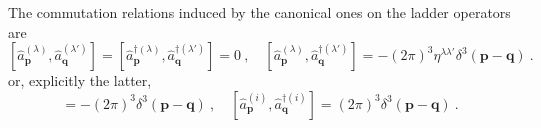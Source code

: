     The commutation relations induced by the canonical ones on the ladder operators are 
    \begin{equation}\label{max:coml}
        [\hat a_{\mathbf p}^{(\lambda)}, \hat a_{\mathbf q}^{(\lambda')}] = [\hat a_{\mathbf p}^{\dagger (\lambda)}, \hat a_{\mathbf q}^{\dagger (\lambda')}] = 0 ~, \quad [\hat a_{\mathbf p}^{(\lambda)}, \hat a_{\mathbf q}^{\dagger(\lambda')}] = - (2\pi)^3 \eta^{\lambda \lambda'} \delta^3 (\mathbf p - \mathbf q) ~.
    \end{equation}
    or, explicitly the latter, 
    \begin{equation*}
        [\hat a_{\mathbf p}^{(0)}, \hat a_{\mathbf q}^{\dagger (0)}] = - (2\pi)^3 \delta^3 (\mathbf p - \mathbf q) ~, \quad [\hat a_{\mathbf p}^{(i)}, \hat a_{\mathbf q}^{\dagger (i)}] = (2\pi)^3 \delta^3 (\mathbf p - \mathbf q) ~.
    \end{equation*}
